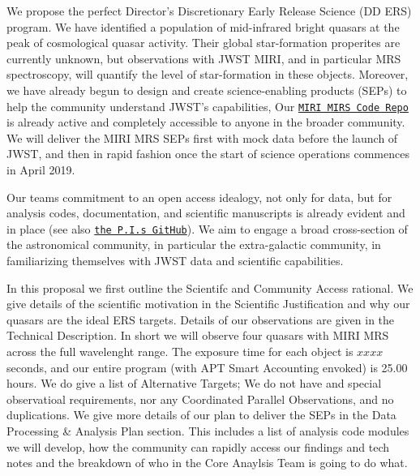 We propose the perfect Director’s Discretionary Early Release Science
(DD ERS) program. We have identified a population of mid-infrared
bright quasars at the peak of cosmological quasar activity. Their
global star-formation properites are currently unknown, but
observations with JWST MIRI, and in particular MRS spectroscopy, will
quantify the level of star-formation in these objects.
Moreover, we have already begun to design and create science-enabling
products (SEPs) to help the community understand JWST's capabilities,
Our \href{https://github.com/miri-mrs}{{\tt MIRI MIRS Code Repo}} is
already active and completely accessible to anyone in the broader
community.  We will deliver the MIRI MRS SEPs first with mock data
before the launch of JWST, and then in rapid fashion once the start of
science operations commences in April 2019.

\smallskip \smallskip
\noindent
Our teams commitment to an open access idealogy, not only for data,
but for analysis codes, documentation, and scientific manuscripts is
already evident and in place (see also
\href{https://github.com/d80b2t}{{\tt the P.I.s GitHub}}).  We aim to
engage a broad cross-section of the astronomical community, in
particular the extra-galactic community, in familiarizing themselves
with JWST data and scientific capabilities.

\smallskip \smallskip
\noindent
In this proposal we first outline the Scientifc and Community Access rational. 
We give details of the scientific motivation in the Scientific Justification and why our quasars are the ideal ERS targets. 
Details of our observations are given in the Technical Description. In short we will observe four quasars with MIRI MRS across the full wavelenght range. The exposure time for each object is $xxxx$ seconds, and our entire program (with APT Smart Accounting envoked) is 25.00 hours. 
We do give a list of Alternative Targets; We do not have and special observatioal requirements, nor any
Coordinated Parallel Observations, and no duplications.
We give more details of our plan to deliver the SEPs in the Data Processing \& Analysis Plan section. This includes a list of analysis code modules we will develop, how the community can rapidly access our findings and tech notes and the breakdown of who in the Core Anaylsis Team is going to do what. 


